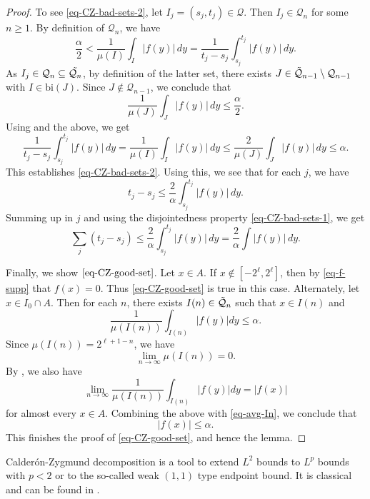 \begin{proof}
To see \eqref{eq-CZ-bad-sets-2}, let $I_j=(s_j, t_j)\in \mathcal{Q}$. Then $I_j\in \mathcal{Q}_n$ for some $n\geq 1$. By definition of $\mathcal{Q}_n$, we have
$$\frac{\alpha}{2}<\frac{1}{\mu(I)}\int_{I} |f(y)|\, dy=\frac{1}{t_j-s_j}\int_{s_j}^{t_j} |f(y)|\, dy.$$
As $I_j\in \mathcal{Q}_n\subseteq \Tilde{\mathcal{Q}_{n}}$, by definition of the latter set, there exists $J\in \Tilde{\mathcal{Q}}_{n-1}\setminus \mathcal{Q}_{n-1}$ with $I\in \textrm{bi} (J)$. Since $J\not\in \mathcal{Q}_{n-1}$, we conclude that
$$\frac{1}{\mu(J)}\int_J |f(y)|\, dy\leq \frac{\alpha}{2}.$$
Using  and the above, we get
$$\frac{1}{t_j-s_j}\int_{s_j}^{t_j} |f(y)|\, dy=\frac{1}{\mu(I)}\int_I |f(y)|\, dy\leq \frac{2}{\mu(J)} \int_J |f(y)|\, dy\leq \alpha.$$
This establishes \eqref{eq-CZ-bad-sets-2}. Using this, we see that for each $j$, we have
$$t_j-s_j\leq \frac{2}{\alpha}\int_{s_j}^{t_j} |f(y)|\, dy.$$
Summing up in $j$ and using the disjointedness property \eqref{eq-CZ-bad-sets-1}, we get
$$\sum_{j} (t_j-s_j)\leq \frac{2}{\alpha}\int_{s_j}^{t_j} |f(y)|\, dy= \frac{2}{\alpha}\int |f(y)|\, dy.$$

Finally, we show $\eqref{eq-CZ-good-set}$. Let $x\in A$. If $x\not \in [-2^{\ell}, 2^{\ell}]$, then by \eqref{eq-f-supp} that $f(x)=0$. Thus \eqref{eq-CZ-good-set} is true in this case. Alternately, let $x\in I_0\cap A$. Then for each $n$, there exists $I(n)\in \Tilde{\mathcal{Q}}_n$ such that $x\in I(n)$ and
\begin{equation}
    \label{eq-avg-In}
    \frac{1}{\mu(I(n))}\int_{I(n)} |f(y)| dy\leq {\alpha}.
\end{equation}
Since $\mu(I(n))=2^{\ell+1-n}$, we have
$$\lim_{n\to \infty} \mu(I(n))=0.$$
By , we also have
\begin{equation*}
 \lim_{n\to \infty}\frac{1}{\mu(I(n))}\int_{I(n)} |f(y)| dy= |f(x)|
\end{equation*}
for almost every $x\in A$.
Combining the above with \eqref{eq-avg-In}, we conclude that
$$|f(x)|\leq \alpha.$$
This finishes the proof of \eqref{eq-CZ-good-set}, and hence the lemma.
\end{proof}

Calder\'on-Zygmund decomposition is a tool to extend $L^2$ bounds to $L^p$ bounds with $p<2$ or to the so-called weak $(1, 1)$ type endpoint bound.
It is classical and can be found in \cite{stein-book}.

